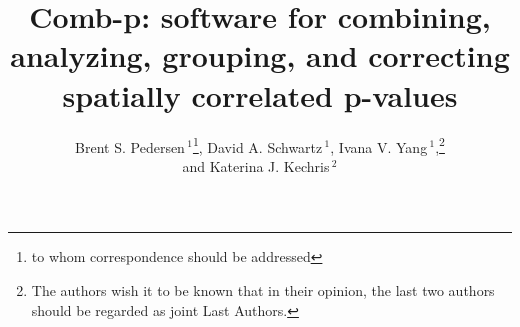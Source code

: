 \documentclass{bioinfo}
\begin{document}

\title[comb-p]{Comb-p: software for combining, analyzing, grouping, and correcting spatially correlated p-values}
\author[Pedersen \textit{et~al}]{Brent S. Pedersen\,$^1$\footnote{to whom correspondence should be addressed},
 David A. Schwartz\,$^1$,
    Ivana V. Yang\,$^1$,\footnote{The authors wish it to be known that in their opinion,
the last two authors should be regarded as joint Last Authors.}

and Katerina J.  Kechris\,$^2$\footnotemark[2]{}

}

\address{$^{1}$Department of Medicine, University of Colorado, Denver, Anschutz Medical Campus, Aurora CO 80045,
USA\\
$^{2}$Department of Statistics, University of Colorado, Denver, Anschutz Medical Campus, Aurora CO 80045, USA\\
}
\end{document}
